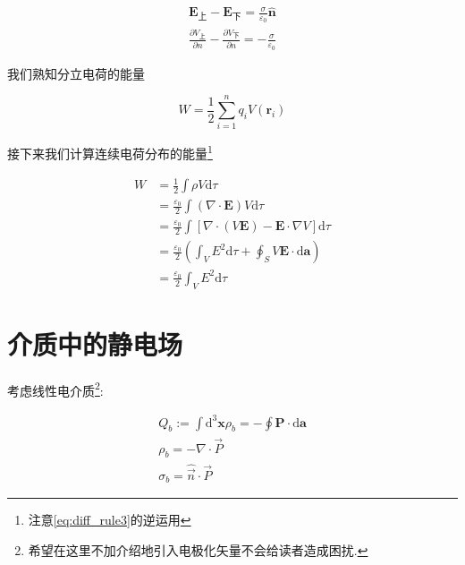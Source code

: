 \begin{theorem}[边界条件]\label{boundary_statement}
    \begin{gather}
        \mathbf{E}_{\text{上}}-\mathbf{E}_{\text{下}}=\frac{\sigma}{\varepsilon _0}\hat{\mathbf{n}}\\
        \frac{\partial V_{\text{上}}}{\partial n}-\frac{\partial V_{\text{下}}}{\partial n}=-\frac{\sigma}{\varepsilon _0}
    \end{gather}
\end{theorem}

我们熟知分立电荷的能量

\begin{theorem}
    \begin{equation}
        W=\frac{1}{2}\sum_{i=1}^n{q_iV\left( \mathbf{r}_i \right)}
    \end{equation}
\end{theorem}

接下来我们计算连续电荷分布的能量\footnote{注意\cref{eq:diff_rule3}的逆运用}

\begin{theorem}
    \begin{align}
        W&=\frac{1}{2}\int{\rho V\mathrm{d}\tau}
        \\
        &=\frac{\varepsilon _0}{2}\int{\left( \nabla \cdot \mathbf{E} \right) V\mathrm{d}\tau}\nonumber
        \\
        &=\frac{\varepsilon _0}{2}\int{\left[ \nabla \cdot \left( V\mathbf{E} \right) -\mathbf{E}\cdot \nabla V \right] \mathrm{d}\tau}\nonumber
        \\
        &=\frac{\varepsilon _0}{2}\left( \int_V{E^2\mathrm{d}\tau}+\oint_S{V\mathbf{E}\cdot \mathrm{d}\mathbf{a}} \right) \nonumber
        \\
        &=\frac{\varepsilon _0}{2}\int_V{E^2\mathrm{d}\tau}
    \end{align}
\end{theorem}

\section{介质中的静电场}

考虑线性电介质\footnote{希望在这里不加介绍地引入电极化矢量不会给读者造成困扰.}:

\begin{theorem}[束缚电荷]
    \begin{gather}
        Q_b:=\int{\mathrm{d}^3\mathbf{x}\rho _b}=-\oint{\mathbf{P}\cdot \mathrm{d}\mathbf{a}}\\
        \rho_b = -\nabla \cdot \vec P\\
        \sigma_b = \hat{\vec n}\cdot \vec P
    \end{gather}
\end{theorem}

